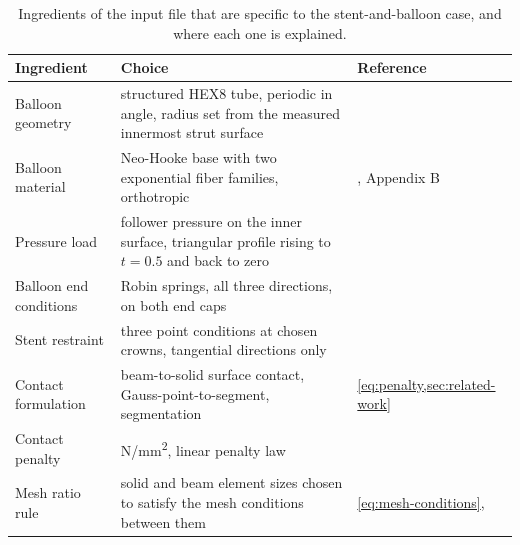 \begin{table}[htb]
  \centering
  \begin{tabular}{@{}>{\raggedright\arraybackslash}m{}>{\raggedright\arraybackslash}m{}>{\raggedright\arraybackslash}m{}@{}}
    \toprule
    \textbf{Ingredient} & \textbf{Choice} & \textbf{Reference} \\
    \midrule
    Balloon geometry & structured HEX8 tube, periodic in angle, radius set from the measured innermost strut surface & \citet{datz2025} \\
    \midrule
    Balloon material & Neo-Hooke base with two exponential fiber families, orthotropic & \citet{datz2025}, Appendix B \\
    \midrule
    Pressure load & follower pressure on the inner surface, triangular profile rising to $t = 0.5$ and back to zero & \citet{datz2025} \\
    \midrule
    Balloon end conditions & Robin springs, all three directions, on both end caps & \citet{datz2025} \\
    \midrule
    Stent restraint & three point conditions at chosen crowns, tangential directions only & \citet{datz2025} \\
    \midrule
    Contact formulation & beam-to-solid surface contact, Gauss-point-to-segment, segmentation & \cref{eq:penalty,sec:related-work} \\
    \midrule
    Contact penalty & 10 N/mm\textsuperscript{2}, linear penalty law & \citet{datz2025} \\
    \midrule
    Mesh ratio rule & solid and beam element sizes chosen to satisfy the mesh conditions between them & \cref{eq:mesh-conditions}, \citet{steinbrecher2020} \\
    \bottomrule
  \end{tabular}
  \caption{Ingredients of the input file that are specific to the stent-and-balloon case, and where each one is explained.}
  \label{tab:balloon-ingredients}
\end{table}

